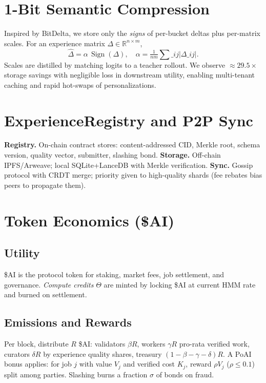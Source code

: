\documentclass[11pt]{article}
\begin{document}
\section{1-Bit Semantic Compression}\label{sec:bitdelta}
Inspired by BitDelta, we store only the \emph{signs} of per-bucket deltas plus per-matrix scales. For an experience matrix \(\Delta \in \mathbb R^{n\times m}\),
\begin{equation}
 \widehat{\Delta} = \alpha\,\operatorname{Sign}(\Delta),\quad \alpha = \tfrac{1}{nm}\sum\limits\_{ij} |\Delta\_{ij}|.
\end{equation}
Scales are distilled by matching logits to a teacher rollout. We observe \(\approx 29.5\times\) storage savings with negligible loss in downstream utility, enabling multi-tenant caching and rapid hot-swaps of personalizations.

\section{ExperienceRegistry and P2P Sync}
\textbf{Registry.} On-chain contract stores: content-addressed CID, Merkle root, schema version, quality vector, submitter, slashing bond. \textbf{Storage.} Off-chain IPFS/Arweave; local SQLite+LanceDB with Merkle verification. \textbf{Sync.} Gossip protocol with CRDT merge; priority given to high-quality shards (fee rebates bias peers to propagate them).

\section{Token Economics (\$AI)}
\subsection{Utility}
\$AI is the protocol token for staking, market fees, job settlement, and governance. \emph{Compute credits} \(\Theta\) are minted by locking \$AI at current HMM rate and burned on settlement.

\subsection{Emissions and Rewards}
Per block, distribute \(R\) \$AI: validators \(\beta R\), workers \(\gamma R\) pro-rata verified work, curators \(\delta R\) by experience quality shares, treasury \((1-\beta-\gamma-\delta)R\). A PoAI bonus applies: for job \(j\) with value \(V_j\) and verified cost \(K_j\), reward \(\rho V_j\) (\(\rho\le 0.1\)) split among parties. Slashing burns a fraction \(\sigma\) of bonds on fraud.
\end{document}
